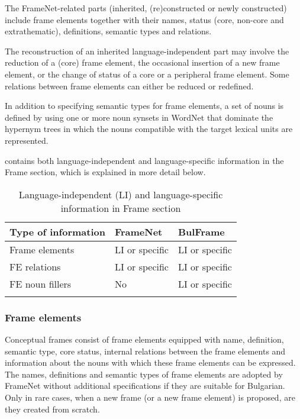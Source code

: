 \documentclass[output=paper,colorlinks,citecolor=brown]{langscibook}
\begin{document}
The FrameNet-related parts (inherited, (re)constructed or newly constructed) include frame elements together with their names, status (core, non-core and extrathematic), definitions, semantic types and relations.

The reconstruction of an inherited language-independent part may involve the reduction of a (core) frame element, the occasional insertion of a new frame element, or the change of status of a core or a peripheral frame element. Some relations between frame elements can either be reduced or redefined.

In addition to specifying semantic types for frame elements, a set of nouns is defined by using one or more noun synsets in WordNet that dominate the hypernym trees in which the nouns compatible with the target lexical units are represented.

 contains both language-independent and language-specific information in the Frame section, which is explained in more detail below.

\begin{table}
    \begin{tabular}{lll}
    \lsptoprule
       Type of information & FrameNet & BulFrame  \\\midrule
       Frame elements & LI or specific & LI or specific\\
       FE relations & LI or specific & LI or specific\\
       FE noun fillers  & No & LI or specific\\
     \lspbottomrule
    \end{tabular}
  \caption{Language-independent (LI) and language-specific information in Frame section}
   \label{tab:my_label5}
\end{table}  


\subsubsection{Frame elements}

Conceptual frames consist of frame elements equipped with name, definition, semantic type, core status, internal relations between the frame elements and information about the nouns with which these frame elements can be expressed. The names, definitions and semantic types of frame elements are adopted by FrameNet without additional specifications if they are suitable for Bulgarian. Only in rare cases, when a new frame (or a new frame element) is proposed, are they created from scratch.
\end{document}
